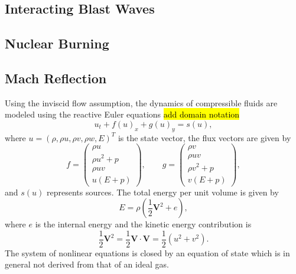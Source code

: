 \documentclass[12pt,letterpaper]{article}
\begin{document}
    \subsection*{Interacting Blast Waves}

    \subsection*{Nuclear Burning}

    \subsection*{Mach Reflection}
    Using the inviscid flow assumption, the dynamics of compressible fluids are
    modeled using the reactive Euler equations \hl{add domain notation}
    \begin{equation}
       u_{t} + f(u)_{x}
       + g(u)_{y} = s(u),
        \label{goveq}
    \end{equation}
    where $u = \left( \rho, \rho u, \rho v, \rho w, E \right)^{T}$ is
    the state vector, the flux vectors are given by
    \begin{equation}
        f = 
    \begin{pmatrix}
    \rho u \\ \rho u^2 + p \\ \rho u v \\ u( E + p )
    \end{pmatrix}, \text{ } \text{ } \text{ }
        g = 
    \begin{pmatrix}
    \rho v \\ \rho u v \\ \rho v^2 + p \\ v( E + p )
    \end{pmatrix},
    \end{equation}
    and $s(u)$ represents sources. The total energy per
    unit volume is given by
    \begin{equation*}
        E = \rho \left( \frac{1}{2} \mathbf{V}^{2} + e \right),
    \end{equation*}
    where $e$ is the internal energy and the kinetic energy contribution is
    \begin{equation*}
        \frac{1}{2} \mathbf{V}^{2} = \frac{1}{2} \mathbf{V}
        \cdot \mathbf{V} = \frac{1}{2} \left( u^2 + v^2 \right).
    \end{equation*}
    The system of nonlinear equations is closed by an
    equation of state which is in general not derived from that of an ideal gas.
\end{document}
